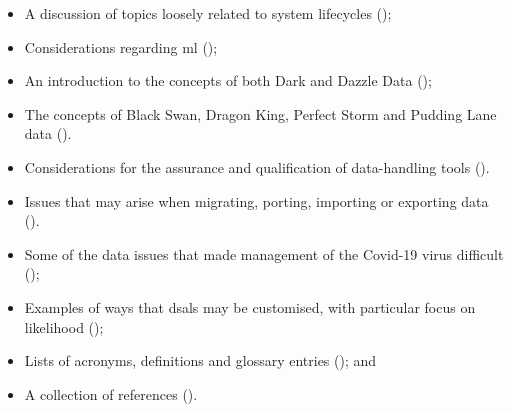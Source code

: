 \begin{itemize}
\begin{itemize}
      \item A discussion of topics loosely related to system lifecycles ();
      \item Considerations regarding \gls{ml} ();
      \item An introduction to the concepts of both Dark and Dazzle Data ();
      \item The concepts of Black Swan, Dragon King, Perfect Storm and Pudding Lane data ().
      \item Considerations for the assurance and qualification of data-handling tools ().
      \item Issues that may arise when migrating, porting, importing or exporting data ().            
      \item Some of the data issues that made management of the Covid-19 virus difficult ();
      \item Examples of ways that \glspl{dsal} may be customised, with particular focus on likelihood ();
      \item Lists of acronyms, definitions and glossary entries (); and
      \item A collection of references ().
    \end{itemize}
\end{itemize}

%
%
\makeatletter		%
\dsiwg@intblankpage
\makeatother
\setcounter{tocdepth}{2}
\tableofcontents

%
%
\listoftables
%
\listoffigures
\cleardoublepage%
